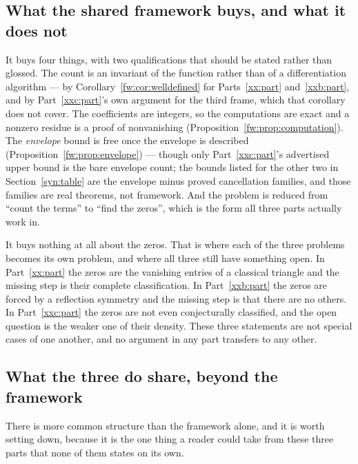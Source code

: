 \documentclass[11pt,a4paper]{article}
\numberwithin{equation}{section}
\theoremstyle{definition}
\theoremstyle{remark}
\theoremstyle{plain}
\begin{document}
\subsection{What the shared framework buys, and what it does not}\label{syn:buys}

It buys four things, with two qualifications that should be stated rather than
glossed.  The count is an invariant of the function rather than of a
differentiation algorithm --- by Corollary~\ref{fw:cor:welldefined} for
Parts~\ref{xx:part} and~\ref{xxb:part}, and by Part~\ref{xxc:part}'s own
argument for the third frame, which that corollary does not cover.  The
coefficients are integers, so the computations are exact and a nonzero residue
is a proof of nonvanishing (Proposition~\ref{fw:prop:computation}).  The
\emph{envelope} bound is free once the envelope is described
(Proposition~\ref{fw:prop:envelope}) --- though only Part~\ref{xxc:part}'s
advertised upper bound is the bare envelope count; the bounds listed for the
other two in Section~\ref{syn:table} are the envelope minus proved cancellation
families, and those families are real theorems, not framework.  And the problem
is reduced from ``count the terms'' to ``find the zeros'', which is the form all
three parts actually work in.

It buys nothing at all about the zeros.  That is where each of the three
problems becomes its own problem, and where all three still have something
open.  In
Part~\ref{xx:part} the zeros are the vanishing entries of a classical triangle
and the missing step is their complete classification.  In Part~\ref{xxb:part}
the zeros are forced by a reflection symmetry and the missing step is that there
are no others.  In Part~\ref{xxc:part} the zeros are not even conjecturally
classified, and the open question is the weaker one of their density.  These
three statements are not special cases of one another, and no argument in any
part transfers to any other.

\subsection{What the three do share, beyond the framework}\label{syn:share}

There is more common structure than the framework alone, and it is worth setting
down, because it is the one thing a reader could take from these three parts
that none of them states on its own.
\end{document}
